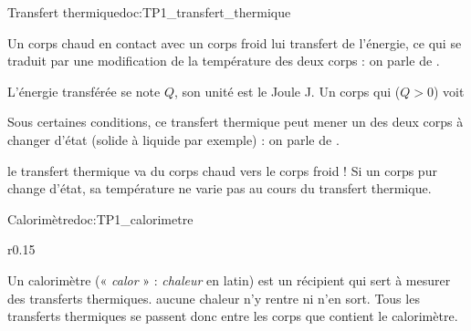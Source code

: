\begin{doc}{Transfert thermique}{doc:TP1_transfert_thermique}
  \begin{importants}
    Un corps chaud en contact avec un corps froid lui transfert de l'énergie, ce qui se traduit par une modification de la température des deux corps : on parle de .
  \end{importants}
  L'énergie transférée se note $Q$, son unité est le Joule \unit{\joule}.
  Un corps qui  ($Q > 0$) voit 
  
  \begin{importants}
    Sous certaines conditions, ce transfert thermique peut mener un des deux corps à changer d'état (solide à liquide par exemple) : on parle de .
  \end{importants}
  \attention le transfert thermique va  du corps chaud vers le corps froid !
  Si un corps pur change d'état, sa température ne varie pas au cours du transfert thermique.
\end{doc}

\begin{doc}{Calorimètre}{doc:TP1_calorimetre}
  \begin{wrapfigure}{r}{0.15\linewidth}
    \centering
    \vspace*{-30pt}
  \end{wrapfigure}
  
  Un calorimètre (« \textit{calor} » : \textit{chaleur} en latin) est un récipient qui sert à mesurer des transferts thermiques.
   aucune chaleur n'y rentre ni n'en sort.
  Tous les transferts thermiques se passent donc entre les corps que contient le calorimètre.
\end{doc}

